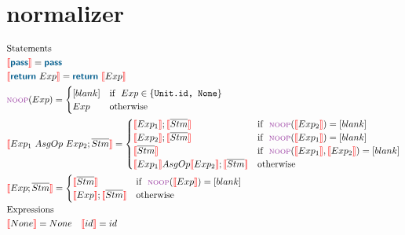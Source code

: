 \documentclass{thesis}
\newcommand{\mblue}[1]{\textbf{\textsf{\color{MidnightBlue}#1}}}
\newcommand{\nl}[1]{{\color{red}{\llbracket}}#1{\color{red}{\rrbracket}}} %
\begin{document}
\section{normalizer}
\begin{align*}
  & \text{Statements}\\
  & \nl{\mblue{pass}} = \mblue{pass}\\
  & \nl{\mblue{return}~Exp} = \mblue{return} ~ \nl{Exp}\\
  & {\scriptsize{\text{\color{Purple}NOOP}}}(Exp) = 
  \begin{cases}
    [blank] & \text{if}~~ Exp \in \{\texttt{Unit.id, None}\}\\
    Exp & \text{otherwise}
  \end{cases}\\
  & \nl{Exp_1 ~AsgOp~ Exp_2 ; \overline{Stm}} = 
  \begin{cases}
    \nl{Exp_1} ; \nl{\overline{Stm}} & \text{if}~~ {\scriptsize{\text{\color{Purple}NOOP}}}(\nl{Exp_2}) = [blank]\\
    \nl{Exp_2} ; \nl{\overline{Stm}} & \text{if}~~ {\scriptsize{\text{\color{Purple}NOOP}}}(\nl{Exp_1}) = [blank]\\
    \nl{\overline{Stm}} & \text{if}~~ {\scriptsize{\text{\color{Purple}NOOP}}}(\nl{Exp_1},\nl{Exp_2}) = [blank]\\
    \nl{Exp_1} AsgOp \nl{Exp_2} ; \nl{\overline{Stm}} & \text{otherwise}
  \end{cases}\\
  & \nl{Exp;\overline{Stm}} =
  \begin{cases}
    \nl{\overline{Stm}} & \text{if}~~ {\scriptsize{\text{\color{Purple}NOOP}}}(\nl{Exp}) = [blank]\\
    \nl{Exp} ; \nl{\overline{Stm}} & \text{otherwise}
  \end{cases}\\
  & \text{Expressions}\\
  & \nl{None} = None ~~~ \nl{id} = id 
\end{align*}
\end{document}
